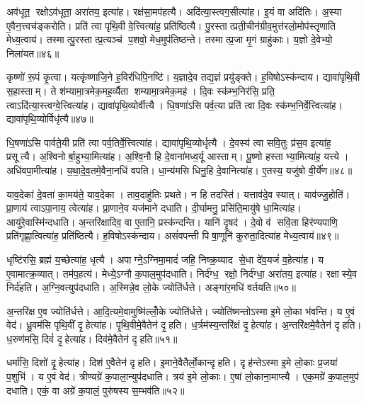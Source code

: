 अव॑धूत॒ रक्षोऽव॑धूता॒ अरा॑तय॒ इत्या॑ह। रक्ष॑सा॒मप॑हत्यै। अदि॑त्या॒स्त्वग॒सीत्या॑ह। इ॒यं वा अदि॑तिः। अ॒स्या ए॒वैन॒त्त्वच॑ङ्करोति। प्रति॑ त्वा पृथि॒वी वे॒त्त्वित्या॑ह॒ प्रति॑ष्ठित्यै। पु॒रस्तात्प्रती॒चीन॑ग्रीव॒मुत्त॑रलो॒मोप॑स्तृणाति मेध्य॒त्वाय॑। तस्मात्पु॒रस्तात्प्र॒त्यञ्च॑ प॒शवो॒ मेध॒मुप॑तिष्ठन्ते। तस्मात्प्र॒जा मृ॒गं ग्राहु॑काः। य॒ज्ञो दे॒वेभ्यो॒ निला॑यत॥४६॥

कृष्णो॑ रू॒पं कृ॒त्वा। यत्कृ॑ष्णाजि॒ने ह॒विर॑धिपि॒नष्टि॑। य॒ज्ञादे॒व तद्य॒ज्ञं प्रयु॑ङ्क्ते। ह॒विषोऽस्क॑न्दाय। द्यावा॑पृथि॒वी स॒हास्ताम्। ते श॑म्यामा॒त्रमेक॒मह॒र्व्यैता शम्यामा॒त्रमेक॒मह॑। दि॒वः स्क॑म्भ॒निर॑सि॒ प्रति॒ त्वाऽदि॑त्या॒स्त्वग्वे॒त्त्वित्या॑ह। द्यावा॑पृथि॒व्योर्वीत्यै। धि॒षणा॑ऽसि पर्व॒त्या प्रति॑ त्वा दि॒वः स्क॑म्भ॒निर्वे॒त्त्वित्या॑ह। द्यावा॑पृथि॒व्योर्विधृ॑त्यै॥४७॥

धि॒षणा॑ऽसि पार्वते॒यी प्रति॑ त्वा पर्व॒तिर्वे॒त्त्वित्या॑ह। द्यावा॑पृथि॒व्योर्धृत्यै। दे॒वस्य॑ त्वा सवि॒तुः प्र॑स॒व इत्या॑ह॒ प्रसूत्यै। अ॒श्विनोर्बा॒हुभ्या॒मित्या॑ह। अ॒श्वि॒नौ हि दे॒वाना॑मध्व॒र्यू आस्ताम्। पू॒ष्णो हस्ताभ्या॒मित्या॑ह॒ यत्त्ये। अधि॑वपा॒मीत्या॑ह। य॒था॒दे॒व॒तमे॒वैना॒नधि॑ वपति। धा॒न्य॑मसि धिनु॒हि दे॒वानित्या॑ह। ए॒तस्य॒ यजु॑षो वी॒र्ये॑ण॥४८॥

याव॒देका॑ दे॒वता॑ का॒मय॑ते॒ याव॒देका। ताव॒दाहु॑तिः प्रथते। न हि तदस्ति॑। यत्ताव॑दे॒व स्यात्। याव॑ज्जु॒होति॑। प्रा॒णाय॑ त्वाऽपा॒नाय॒ त्वेत्या॑ह। प्रा॒णाने॒व यज॑माने दधाति। दी॒र्घामनु॒ प्रसि॑ति॒मायु॑षे धा॒मित्या॑ह। आयु॑रे॒वास्मि॑न्दधाति। अ॒न्तरि॑क्षादिव॒ वा ए॒तानि॒ प्रस्क॑न्दन्ति। यानि॑ दृ॒षद॑। दे॒वो व॑ सवि॒ता हिर॑ण्यपाणि॒ प्रति॑गृह्णा॒त्वित्या॑ह॒ प्रति॑ष्ठित्यै। ह॒विषोऽस्क॑न्दाय। असं॑वपन्ती पिषा॒णूनि॑ कुरुता॒दित्या॑ह मेध्य॒त्वाय॑॥४९॥\anuvakamend[निला॑यत॒ विधृ॑त्यै वी॒र्ये॑ण स्कन्दन्ति च॒त्वारि॑ च]

धृष्टि॑रसि॒ ब्रह्म॑ य॒च्छेत्या॑ह॒ धृत्यै। अपाग्ने॒ऽग्निमा॒मादं॑ जहि॒ निष्क्र॒व्याद से॒धा दे॑व॒यजं॑ व॒हेत्या॑ह। य ए॒वामात्क्र॒व्यात्। तम॑प॒हत्य॑। मेध्ये॒ऽग्नौ क॒पाल॒मुप॑दधाति। निर्द॑ग्ध॒ रक्षो॒ निर्द॑ग्धा॒ अरा॑तय॒ इत्या॑ह। रक्षास्ये॒व निर्द॑हति। अ॒ग्नि॒वत्युप॑दधाति। अ॒स्मिन्ने॒व लो॒के ज्योति॑र्धत्ते। अङ्गा॑र॒मधि॑ वर्तयति॥५०॥

अ॒न्तरि॑क्ष ए॒व ज्योति॑र्धत्ते। आ॒दि॒त्यमे॒वामुष्मि॑ल्लोँ॒के ज्योति॑र्धत्ते। ज्योति॑ष्मन्तोऽस्मा इ॒मे लो॒का भ॑वन्ति। य ए॒वं वेद॑। ध्रु॒वम॑सि पृथि॒वीं दृ॒हेत्या॑ह। पृ॒थि॒वीमे॒वैतेन॑ दृ॒हति। ध॒र्त्रम॑स्य॒न्तरि॑क्षं दृ॒हेत्या॑ह। अ॒न्तरि॑क्षमे॒वैतेन॑ दृहति। ध॒रुण॑मसि॒ दिवं॑ दृ॒हेत्या॑ह। दिव॑मे॒वैतेन॑ दृहति॥५१॥

धर्मा॑सि॒ दिशो॑ दृ॒हेत्या॑ह। दिश॑ ए॒वैतेन॑ दृहति। इ॒माने॒वैतैर्लो॒कान्दृहति। दृह॑न्तेऽस्मा इ॒मे लो॒काः प्र॒जया॑ प॒शुभि॑। य ए॒वं वेद॑। त्रीण्यग्रे॑ क॒पाला॒न्युप॑दधाति। त्रय॑ इ॒मे लो॒काः। ए॒षां लो॒काना॒माप्त्यै। एक॒मग्रे॑ क॒पाल॒मुप॑ दधाति। एकं॒ वा अग्रे॑ क॒पालं॒ पुरु॑षस्य स॒म्भव॑ति॥५२॥

